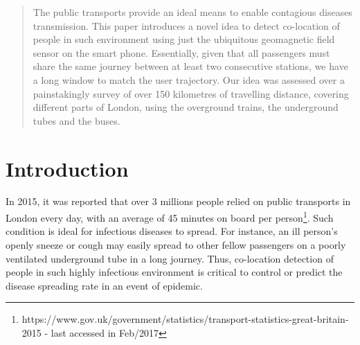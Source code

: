 \documentclass[conference]{IEEEtran}
\begin{document}




\maketitle

\begin{abstract}
The public transports provide an ideal means to enable contagious diseases transmission. This paper introduces a novel idea to detect co-location of people in such environment using just the ubiquitous geomagnetic field sensor on the smart phone. Essentially, given that all passengers must share the same journey between at least two consecutive stations, we have a long window to match the user trajectory. Our idea was assessed over a painstakingly survey of over 150 kilometres of travelling distance, covering different parts of London, using the overground trains, the underground tubes and the buses.
\end{abstract}





%
\IEEEpeerreviewmaketitle



\section{Introduction}
In 2015, it was reported that over 3 millions people relied on public transports in London every day, with an average of 45 minutes on board per person\footnote{https://www.gov.uk/government/statistics/transport-statistics-great-britain-2015 - last accessed in Feb/2017}. Such condition is ideal for infectious diseases to spread. For instance, an ill person's openly sneeze or cough may easily spread to other fellow passengers on a poorly ventilated underground tube in a long journey. Thus, co-location detection of people in such highly infectious environment is critical to control or predict the disease spreading rate in an event of epidemic.
\end{document}
